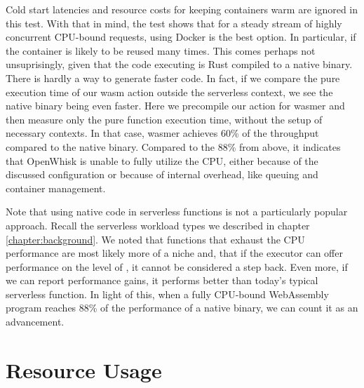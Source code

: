 Cold start latencies and resource costs for keeping containers warm are ignored in this test. With that in mind, the test shows that for a steady stream of highly concurrent CPU-bound requests, using Docker is the best option. In particular, if the container is likely to be reused many times. This comes perhaps not unsuprisingly, given that the code executing is Rust compiled to a native  binary. There is hardly a way to generate faster code. In fact, if we compare the pure execution time of our wasm action outside the serverless context, we see the native binary being even faster. Here we precompile our action for wasmer and then measure only the pure function execution time, without the setup of necessary contexts. In that case, wasmer achieves 60\% of the throughput compared to the native binary. Compared to the 88\% from above, it indicates that OpenWhisk is unable to fully utilize the CPU, either because of the discussed configuration or because of internal overhead, like queuing and container management. 

Note that using native code in serverless functions is not a particularly popular approach. Recall the serverless workload types we described in chapter \ref{chapter:background}. We noted that functions that exhaust the CPU performance are most likely more of a niche and, that if the executor can offer performance on the level of , it cannot be considered a step back. Even more, if we can report performance gains, it performs better than today's typical serverless function. In light of this, when a fully CPU-bound WebAssembly program reaches 88\% of the performance of a native binary, we can count it as an advancement. 


\section{Resource Usage}

